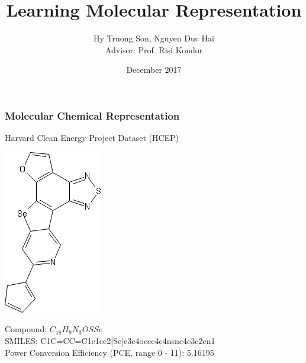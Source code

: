 \documentclass{beamer}
\title[Learning Molecular Representation]{Learning Molecular Representation}
\author[Hy et al.]{Hy Truong Son, Nguyen Duc Hai \\ Advisor: Prof. Risi Kondor}
\institute[UChicago]{The University of Chicago}
\date{December 2017}
\begin{document}

\frame{\titlepage}

\begin{frame}
\frametitle{Molecular Chemical Representation}
\begin{justify}
\begin{center}
	Harvard Clean Energy Project Dataset (HCEP)
\end{center}
\begin{center}
	\includegraphics[scale=0.5]{sketcher}
\end{center}
Compound: $C_{18}H_9N_3OSSe$ \\
SMILES: C1C=CC=C1c1cc2[Se]c3c4occc4c4nsnc4c3c2cn1 \\
Power Conversion Efficiency (PCE, range 0 - 11): 5.16195
\end{justify}
\end{frame}
\end{document}
